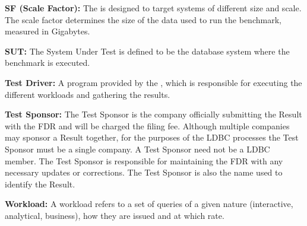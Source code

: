 {\flushleft \textbf{SF (Scale Factor):}} The \ldbcsnb is designed to target systems of
different size and scale. The scale factor determines the size of the data used
to run the benchmark, measured in Gigabytes.


{\flushleft \textbf{SUT:}} The System Under Test  is defined
to be the database system where the benchmark is executed.


{\flushleft \textbf{Test Driver:}}  A program provided by the \ldbcsnb, which
is responsible for executing the different workloads and gathering the results.

{\flushleft \textbf{Test Sponsor:}} The Test Sponsor is the company officially
submitting the Result with the FDR and will be charged the filing fee. Although
multiple companies may sponsor a Result together, for the purposes of the LDBC
processes the Test Sponsor must be a single company. A Test Sponsor need not be
a LDBC member. The Test Sponsor is responsible for maintaining the FDR with any
necessary updates or corrections. The Test Sponsor is also the name used to
identify the Result.

%



{\flushleft \textbf{Workload:}} A workload refers to a set of queries of a given nature
(\ie interactive, analytical, business), how they are issued and at which rate.

